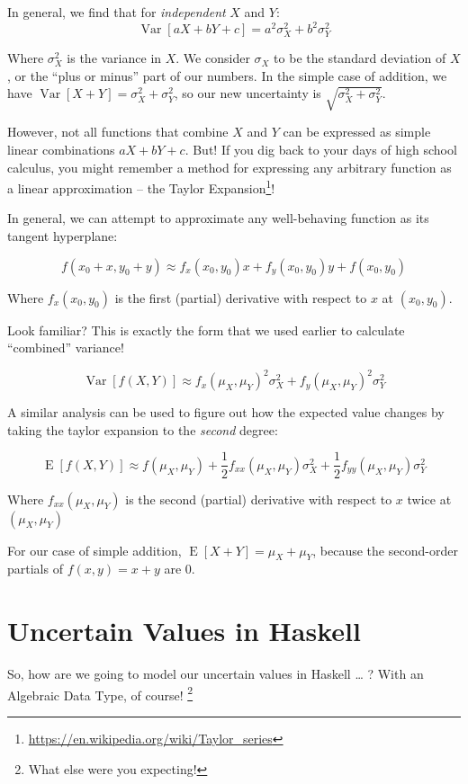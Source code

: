 \documentclass[]{article}
\renewcommand{\href}[2]{#2\footnote{\url{#1}}}
\begin{document}
In general, we find that for \emph{independent} \(X\) and \(Y\): \[
\operatorname{Var}[aX + bY + c] = a^2 \sigma_X^2 + b^2 \sigma_Y^2
\]

Where \(\sigma_X^2\) is the variance in \(X\). We consider \(\sigma_X\)
to be the standard deviation of \(X\), or the ``plus or minus'' part of
our numbers. In the simple case of addition, we have
\(\operatorname{Var}[X + Y] = \sigma_X^2 + \sigma_Y^2\), so our new
uncertainty is \(\sqrt{\sigma_X^2 + \sigma_Y^2}\).

However, not all functions that combine \(X\) and \(Y\) can be expressed
as simple linear combinations \(aX + bY + c\). But! If you dig back to
your days of high school calculus, you might remember a method for
expressing any arbitrary function as a linear approximation -- the
\href{https://en.wikipedia.org/wiki/Taylor_series}{Taylor Expansion}!

In general, we can attempt to approximate any well-behaving function as
its tangent hyperplane:

\[
f(x_0 + x, y_0 + y) \approx f_x(x_0, y_0) x + f_y(x_0, y_0) y + f(x_0, y_0)
\]

Where \(f_x(x_0,y_0)\) is the first (partial) derivative with respect to
\(x\) at \((x_0, y_0)\).

Look familiar? This is exactly the form that we used earlier to
calculate ``combined'' variance!

\[
\operatorname{Var}[f(X,Y)] \approx f_x(\mu_X, \mu_Y)^2 \sigma_X^2 + f_y(\mu_X,\mu_Y)^2 \sigma_Y^2
\]

A similar analysis can be used to figure out how the expected value
changes by taking the taylor expansion to the \emph{second} degree:

\[
\operatorname{E}[f(X,Y)] \approx
f(\mu_X, \mu_Y) +
\frac{1}{2} f_{xx}(\mu_X, \mu_Y) \sigma_X^2 +
\frac{1}{2} f_{yy}(\mu_X, \mu_Y) \sigma_Y^2
\]

Where \(f_{xx}(\mu_X, \mu_Y)\) is the second (partial) derivative with
respect to \(x\) twice at \((\mu_X, \mu_Y)\)

For our case of simple addition,
\(\operatorname{E}[X + Y] = \mu_X + \mu_Y\), because the second-order
partials of \(f(x,y) = x + y\) are 0.

\section{Uncertain Values in Haskell}\label{uncertain-values-in-haskell}

So, how are we going to model our uncertain values in Haskell \ldots{} ?
With an Algebraic Data Type, of course! \footnote{What else were you
  expecting!}
\end{document}
